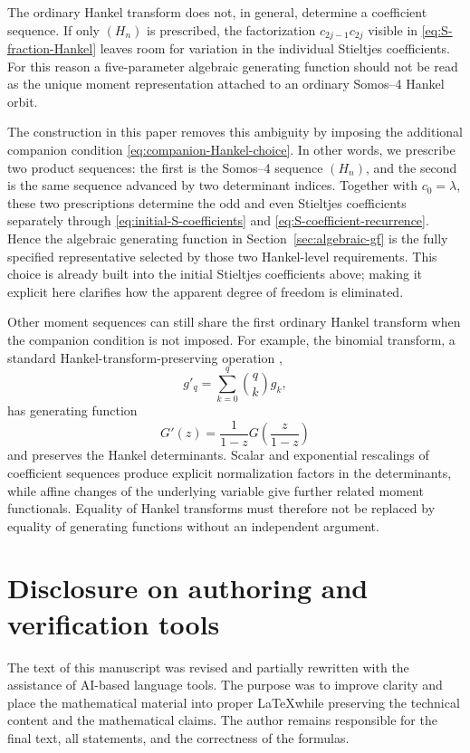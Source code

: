 \documentclass[11pt]{article}
\theoremstyle{remark}
\begin{document}
The ordinary Hankel transform does not, in general, determine a coefficient
sequence.  If only $(H_n)$ is prescribed, the factorization
$c_{2j-1}c_{2j}$ visible in \eqref{eq:S-fraction-Hankel} leaves room for
variation in the individual Stieltjes coefficients.  For this reason a
five-parameter algebraic generating function should not be read as the unique
moment representation attached to an ordinary Somos--4 Hankel orbit.

The construction in this paper removes this ambiguity by imposing the
additional companion condition \eqref{eq:companion-Hankel-choice}.  In other
words, we prescribe two product sequences: the first is the Somos--4 sequence
$(H_n)$, and the second is the same sequence advanced by two determinant
indices.  Together with $c_0=\lambda$, these two prescriptions determine the
odd and even Stieltjes coefficients separately through
\eqref{eq:initial-S-coefficients} and \eqref{eq:S-coefficient-recurrence}.
Hence the algebraic generating function in Section~\ref{sec:algebraic-gf} is
the fully specified representative selected by those two Hankel-level
requirements.  This choice is already built into the initial Stieltjes
coefficients above; making it explicit here clarifies how the apparent degree
of freedom is eliminated.

Other moment sequences can still share the first ordinary Hankel transform
when the companion condition is not imposed.  For example, the binomial
transform, a standard Hankel-transform-preserving operation
\cite{Layman2001,French2007},
\begin{equation}
 g'_q=\sum_{k=0}^{q}\binom{q}{k}g_k,
 \label{eq:binomial-transform}
\end{equation}
has generating function
\[
 G'(z)=\frac{1}{1-z}G\!\left(\frac{z}{1-z}\right)
\]
and preserves the Hankel determinants.  Scalar and exponential rescalings of
coefficient sequences produce explicit normalization factors in the
determinants, while affine changes of the underlying variable give further
related moment functionals.  Equality of Hankel transforms must therefore not
be replaced by equality of generating functions without an independent
argument.

\section*{Disclosure on authoring and verification tools}
The text of this manuscript was revised and partially rewritten with the
assistance of AI-based language tools.  The purpose was to improve clarity and
place the mathematical material into proper \LaTeX while preserving the
technical content and the mathematical claims.  The author remains responsible
for the final text, all statements, and the correctness of the formulas.
\end{document}
